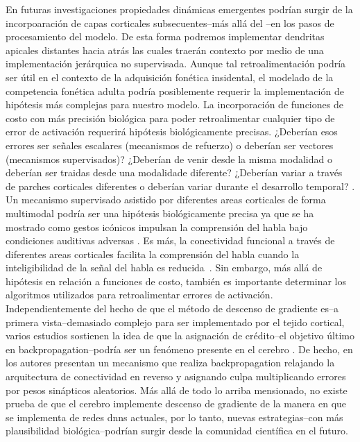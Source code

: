 En futuras investigaciones propiedades dinámicas emergentes podrían surgir de la incorpoaración de capas corticales subsecuentes--más allá del --en los pasos de procesamiento del modelo. De esta forma podremos implementar dendritas apicales distantes hacia atrás las cuales traerán contexto por medio de una implementación jerárquica no supervisada.
Aunque tal retroalimentación podría ser útil en el contexto de la adquisición fonética insidental, el modelado de la competencia fonética adulta podría posiblemente requerir la implementación de hipótesis más complejas para nuestro modelo. La incorporación de funciones de costo con más precisión biológica para poder retroalimentar cualquier tipo de error de activación requerirá hipótesis biológicamente precisas. ¿Deberían esos errores ser señales escalares (mecanismos de refuerzo) o deberían ser vectores (mecanismos supervisados)? ¿Deberían de venir desde la misma modalidad o deberían ser traidas desde una modalidade diferente? ¿Deberían variar a través de parches corticales diferentes o deberían variar durante el desarrollo temporal? \cite{10.3389/fncom.2016.00094}.
Un mecanismo supervisado asistido por diferentes areas corticales de forma multimodal podría ser una hipótesis biológicamente precisa ya que se ha mostrado como gestos icónicos impulsan la comprensión del habla bajo condiciones auditivas adversas \cite{HOLLE2010875}.
Es más, la conectividad funcional a través de diferentes areas corticales facilita la comprensión del habla cuando la inteligibilidad de la señal del habla es reducida~\cite{Obleser2283}. Sin embargo, más allá de hipótesis en relación a funciones de costo, también es importante determinar los algoritmos utilizados para retroalimentar errores de activación. Independientemente del hecho de que el método de descenso de gradiente es--a primera vista--demasiado complejo para ser implementado por el tejido cortical, varios estudios sostienen la idea de que la asignación de crédito--el objetivo último en backpropagation--podría ser un fenómeno presente en el cerebro \cite{Guerguiev2017TowardsDL}. De hecho, en \cite{Lillicrap_2016} los autores presentan un mecanismo que realiza backpropagation relajando la arquitectura de conectividad en reverso y asignando culpa multiplicando errores por pesos sinápticos aleatorios.
Más allá de todo lo arriba mensionado, no existe prueba de que el cerebro implemente descenso de gradiente de la manera en que se implementa de redes \glspl{dnn} actuales, por lo tanto, nuevas estrategias--con más plausibilidad biológica--podrían surgir desde la comunidad científica en el futuro.

